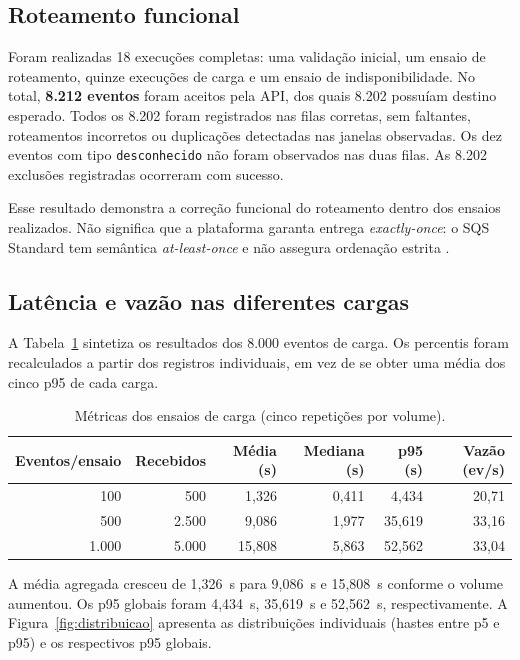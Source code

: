 \documentclass[12pt]{article}
\begin{document}
\subsection{Roteamento funcional}
Foram realizadas 18 execuções completas: uma validação inicial, um ensaio
de roteamento, quinze execuções de carga e um ensaio de indisponibilidade.
No total, \textbf{8.212 eventos} foram aceitos pela API, dos quais 8.202
possuíam destino esperado. Todos os 8.202 foram registrados nas filas
corretas, sem faltantes, roteamentos incorretos ou duplicações detectadas
nas janelas observadas. Os dez eventos com tipo \texttt{desconhecido} não
foram observados nas duas filas. As 8.202 exclusões registradas ocorreram
com sucesso.

Esse resultado demonstra a correção funcional do roteamento dentro dos
ensaios realizados. Não significa que a plataforma garanta entrega
\emph{exactly-once}: o SQS Standard tem semântica \emph{at-least-once}
e não assegura ordenação estrita \cite{aws-sqs-standard}.

\subsection{Latência e vazão nas diferentes cargas}
A Tabela~\ref{tab:desempenho} sintetiza os resultados dos 8.000 eventos de
carga. Os percentis foram recalculados a partir dos registros individuais,
em vez de se obter uma média dos cinco p95 de cada carga.

\begin{table}[ht]
\centering
\caption{Métricas dos ensaios de carga (cinco repetições por volume).}
\label{tab:desempenho}
\small
\setlength{\tabcolsep}{4pt}
\begin{tabular}{rrrrrr}
\toprule
Eventos/ensaio & Recebidos & Média (s) & Mediana (s) & p95 (s) & Vazão (ev/s) \\
\midrule
100 & 500 & 1,326 & 0,411 & 4,434 & 20,71 \\
500 & 2.500 & 9,086 & 1,977 & 35,619 & 33,16 \\
1.000 & 5.000 & 15,808 & 5,863 & 52,562 & 33,04 \\
\bottomrule
\end{tabular}
\end{table}

A média agregada cresceu de 1,326~s para 9,086~s e 15,808~s conforme o
volume aumentou. Os p95 globais foram 4,434~s, 35,619~s e 52,562~s,
respectivamente. A Figura~\ref{fig:distribuicao} apresenta as distribuições
individuais (hastes entre p5 e p95) e os respectivos p95 globais.
\end{document}
